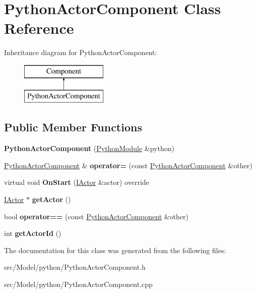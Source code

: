 \hypertarget{classPythonActorComponent}{}\section{Python\+Actor\+Component Class Reference}
\label{classPythonActorComponent}
Inheritance diagram for Python\+Actor\+Component\+:\begin{figure}[H]
\begin{center}
\leavevmode
\includegraphics[height=2.000000cm]{classPythonActorComponent}
\end{center}
\end{figure}
\subsection*{Public Member Functions}
\begin{DoxyCompactItemize}
\item 
{\bfseries Python\+Actor\+Component} (\hyperlink{classPythonModule}{Python\+Module} \&python)\hypertarget{classPythonActorComponent_a17465192e85b313d92f8894c9f4c179f}{}\label{classPythonActorComponent_a17465192e85b313d92f8894c9f4c179f}

\item 
\hyperlink{classPythonActorComponent}{Python\+Actor\+Component} \& {\bfseries operator=} (const \hyperlink{classPythonActorComponent}{Python\+Actor\+Component} \&other)\hypertarget{classPythonActorComponent_a6ca76c019b4402b3ced1c3034fe8a8ed}{}\label{classPythonActorComponent_a6ca76c019b4402b3ced1c3034fe8a8ed}

\item 
virtual void {\bfseries On\+Start} (\hyperlink{classIActor}{I\+Actor} \&actor) override\hypertarget{classPythonActorComponent_a0c514e3ed6b2ee0b06d32abaa3c37ae7}{}\label{classPythonActorComponent_a0c514e3ed6b2ee0b06d32abaa3c37ae7}

\item 
\hyperlink{classIActor}{I\+Actor} $\ast$ {\bfseries get\+Actor} ()\hypertarget{classPythonActorComponent_aec7059e787a38cd48515d9d19fc928e3}{}\label{classPythonActorComponent_aec7059e787a38cd48515d9d19fc928e3}

\item 
bool {\bfseries operator==} (const \hyperlink{classPythonActorComponent}{Python\+Actor\+Component} \&other)\hypertarget{classPythonActorComponent_ac617f58f2ac015f9b16226cc0a20bc33}{}\label{classPythonActorComponent_ac617f58f2ac015f9b16226cc0a20bc33}

\item 
int {\bfseries get\+Actor\+Id} ()\hypertarget{classPythonActorComponent_a24eeb3013d2b7e2d6bc59cbff0535ca2}{}\label{classPythonActorComponent_a24eeb3013d2b7e2d6bc59cbff0535ca2}

\end{DoxyCompactItemize}


The documentation for this class was generated from the following files\+:\begin{DoxyCompactItemize}
\item 
src/\+Model/python/Python\+Actor\+Component.\+h\item 
src/\+Model/python/Python\+Actor\+Component.\+cpp\end{DoxyCompactItemize}
